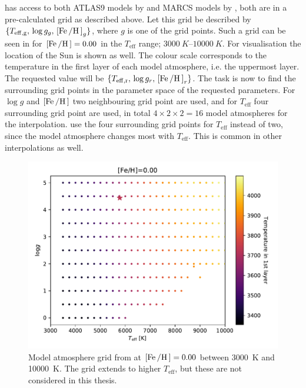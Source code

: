 \FASMA has access to both ATLAS9 models by \citet{Kurucz1993} and MARCS models
by \citet{Gustafson2008}, both are in a pre-calculated grid as described above.
Let this grid be described by $\{T_\mathrm{eff,g},\,\log
g_g,\,[\ion{Fe}/\ion{H}]_g\}$, where $g$ is one of the grid points. Such a grid
can be seen in  for $[\ion{Fe}/\ion{H}]=0.00$ in the
$T_\mathrm{eff}$ range; $\SIrange{3000}{10000}{K}$. For visualisation the
location of the Sun is shown as well. The colour scale corresponds to the
temperature in the first layer of each model atmosphere, i.e. the uppermost
layer. The requested value will be $\{T_\mathrm{eff,r},\,\log
g_r,\,[\ion{Fe}/\ion{H}]_r\}$. The task is now to find the surrounding grid
points in the parameter space of the requested parameters. For $\log g$ and
$[\ion{Fe}/\ion{H}]$ two neighbouring grid point are used, and for
$T_\mathrm{eff}$ four surrounding grid point are used, in total
$4\times2\times2=16$ model atmospheres for the interpolation. \FASMA use the
four surrounding grid points for $T_\mathrm{eff}$ instead of two, since the
model atmosphere changes most with $T_\mathrm{eff}$. This is common in other
interpolations as well.

\begin{figure}[htpb!]
    \centering
    \includegraphics[width=1.0\linewidth]{figures/model_atmosphere.pdf}
    \caption{Model atmosphere grid from \citet{Kurucz1993} at
             $[\ion{Fe}/\ion{H}]=0.00$ between \SI{3000}{K} and \SI{10000}{K}.
             The grid extends to higher $T_\mathrm{eff}$, but these are not
             considered in this thesis.}
    \label{fig:grid}
\end{figure}

